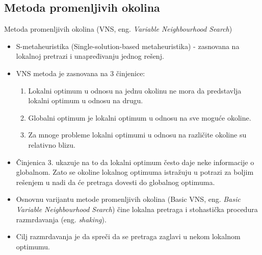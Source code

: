 \documentclass{beamer}
\begin{document}
\subsection{Metoda promenljivih okolina}
\begin{frame}{Metoda promenljivih okolina (VNS, eng. \textit{Variable Neighbourhood Search}) \cite{vnp}}
\scriptsize
\begin{itemize}
    \item S-metaheuristika (Single-solution-based metaheuristika) - zasnovana na lokalnoj pretrazi i unapred̄ivanju jednog rešenj.
    \item VNS metoda je zasnovana na 3 činjenice:
    \begin{enumerate}
    \scriptsize
        \item Lokalni optimum u odnosu na jednu okolinu ne mora da predstavlja lokalni optimum u odnosu na drugu.
        \item Globalni optimum je lokalni optimum u odnosu na sve moguće okoline.
        \item Za mnoge probleme lokalni optimumi u odnosu na različite okoline su relativno blizu.
    \end{enumerate}
    \item Činjenica 3. ukazuje na to da lokalni optimum često daje neke informacije o globalnom. Zato se okoline lokalnog optimuma istražuju u potrazi za boljim rešenjem u nadi da će pretraga dovesti do globalnog optimuma.
    \item Osnovnu varijantu metode promenljivih okolina (Basic VNS, eng. \textit{Basic Variable Neighbourhood Search}) čine lokalna pretraga i stohastička procedura razmrdavanja (eng. \textit{shaking}).
    \item Cilj razmrdavanja je da spreči da se pretraga zaglavi u nekom lokalnom optimumu.
\end{itemize}
\end{frame}
\end{document}
